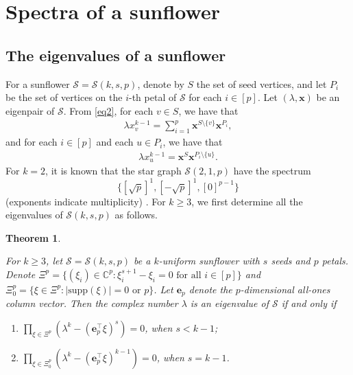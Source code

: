 \documentclass{article}
\newtheorem{thm}{Theorem}[section]
\begin{document}
\section{Spectra of a sunflower}

\subsection{The eigenvalues of a sunflower}

For a sunflower $\mathcal{S}=\mathcal{S}(k,s,p)$,
denote by $S$ the set of seed vertices, and let $P_{i}$ be the set of vertices on the $i$-th petal of $\mathcal{S}$ for each $i\in[p]$.
Let $(\lambda,\mathbf{x})$ be an eigenpair of $\mathcal{S}$.
From \eqref{eq2}, for each $v \in S$, we have that
\begin{align}\label{shi1}
\lambda x_{v}^{k-1}=\sum_{i=1}^{p}\mathbf{x}^{S\setminus\{v\}}\mathbf{x}^{P_{i}},
\end{align}
and for each $i\in[p]$ and each $u\in P_{i}$, we have that
\begin{align}\label{shi2}
\lambda x_{u}^{k-1}=\mathbf{x}^{S}\mathbf{x}^{P_{i}\setminus\{u\}}.
\end{align}
For $k=2$,
it is known that the star graph $\mathcal{S}(2,1,p)$ have the spectrum
$$\{[\sqrt{p}]^{1}, [-\sqrt{p}]^{1}, [0]^{p-1}\}$$ (exponents indicate multiplicity) \cite{cvetkovic1980spectra}.
For $k\geq3$,
we first determine all the eigenvalues of $\mathcal{S}(k,s,p)$ as follows.

\begin{thm}\label{dingli1}

For $k\geq3$,
let $\mathcal{S}=\mathcal{S}(k,s,p)$ be a $k$-uniform sunflower with $s$ seeds and $p$ petals.
Denote $\Xi^{p}=\{(\xi_{i})\in\mathbb{C}^{p}:\mbox{$\xi_{i}^{s+1}-\xi_{i}=0$ for all $i\in[p]$} \}$ and $\Xi^{p}_{0}=\{\xi\in \Xi^{p}: \mbox{$|\mathrm{supp}(\xi)|=0$ or $p$} \}$.
Let $\mathbf{e}_{p}$ denote the $p$-dimensional all-ones column vector.
Then the complex number $\lambda$ is an eigenvalue of $\mathcal{S}$ if and only if
\begin{enumerate}
\renewcommand{\labelenumi}{(\alph{enumi})}

\item  $\prod_{\xi\in\Xi^{p}}(\lambda^{k}-(\mathbf{e}_{p}^{\top}\xi)^{s})=0$, when $s<k-1$;

\item $\prod_{\xi\in\Xi^{p}_{0}}(\lambda^{k}-(\mathbf{e}_{p}^{\top}\xi)^{k-1})=0$, when $s=k-1$.

\end{enumerate}
\end{thm}
\end{document}
